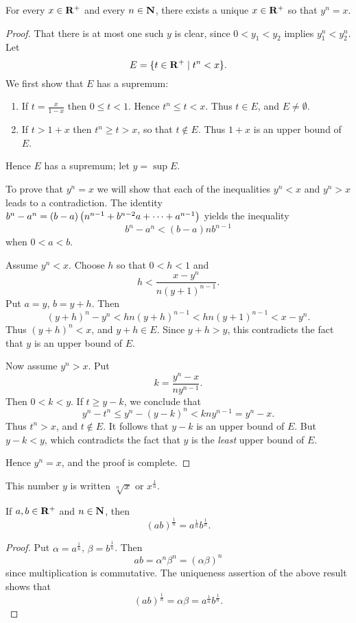 \begin{theorem}
For every $x\in\mathbf R^+$ and every $n\in\mathbf N$, there exists a unique $x\in\mathbf R^+$ so that $y^n=x$.
\end{theorem}

\begin{proof}
That there is at most one such $y$ is clear, since $0<y_1<y_2$ implies $y_1^n<y_2^n$. Let
\[E=\{t\in\mathbf R^+\mid t^n<x\}.\]
We first show that $E$ has a supremum:
\begin{enumerate}[label=(\roman*)]
\item If $t=\frac{x}{1-x}$ then $0\le t<1$. Hence $t^n\le t<x$. Thus $t\in E$, and $E\neq\emptyset$.
\item If $t>1+x$ then $t^n\ge t>x$, so that $t\notin E$. Thus $1+x$ is an upper bound of $E$.
\end{enumerate}
Hence $E$ has a supremum; let $y=\sup E$.

To prove that $y^n=x$ we will show that each of the inequalities $y^n<x$ and $y^n>x$ leads to a contradiction. The identity $b^n-a^n=(b-a)\left(n^{n-1}+b^{n-2}a+\cdots+a^{n-1}\right)$ yields the inequality
\[b^n-a^n<(b-a)nb^{n-1}\]
when $0<a<b$.

Assume $y^n<x$. Choose $h$ so that $0<h<1$ and
\[h<\frac{x-y^n}{n(y+1)^{n-1}}.\]
Put $a=y$, $b=y+h$. Then
\[(y+h)^n-y^n<hn(y+h)^{n-1}<hn(y+1)^{n-1}<x-y^n.\]
Thus $(y+h)^n<x$, and $y+h\in E$. Since $y+h>y$, this contradicts the fact that $y$ is an upper bound of $E$.

Now assume $y^n>x$. Put
\[k=\frac{y^n-x}{ny^{n-1}}.\]
Then $0<k<y$. If $t\ge y-k$, we conclude that
\[y^n-t^n\le y^n-(y-k)^n<kny^{n-1}=y^n-x.\]
Thus $t^n>x$, and $t\notin E$. It follows that $y-k$ is an upper bound of $E$. But $y-k<y$, which contradicts the fact that $y$ is the \emph{least} upper bound of $E$.

Hence $y^n=x$, and the proof is complete.
\end{proof}

\begin{notation}
This number $y$ is written $\sqrt[n]{x}$ or $x^\frac{1}{n}$.
\end{notation}

\begin{corollary}
If $a,b\in\mathbf R^+$ and $n\in\mathbf N$, then
\[(ab)^\frac{1}{n}=a^\frac{1}{n}b^\frac{1}{n}.\]
\end{corollary}

\begin{proof}
Put $\alpha=a^\frac{1}{n}$, $\beta=b^\frac{1}{n}$. Then
\[ab=\alpha^n\beta^n=(\alpha\beta)^n\]
since multiplication is commutative. The uniqueness assertion of the above result shows that
\[(ab)^\frac{1}{n}=\alpha\beta=a^\frac{1}{n}b^\frac{1}{n}.\]
\end{proof}

